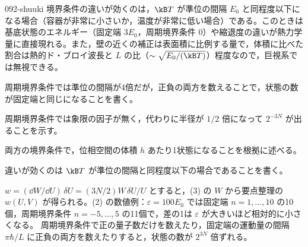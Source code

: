 \documentclass[uplatex,dvipdfmx,a4paper,11pt]{jsarticle}
\begin{document}
\begin{kaisetsu}{092-shuuki}
境界条件の違いが効くのは，$\kB T$ が準位の間隔 $E_{0}$ と同程度以下になる場合（容器が非常に小さいか，温度が非常に低い場合）である。このときは基底状態のエネルギー（固定端 $3E_{0}$，周期境界条件 $0$）や縮退度の違いが熱力学量に直接現れる。また，壁の近くの補正は表面積に比例する量で，体積に比べた割合は熱的ド・ブロイ波長と $L$ の比（$\sim\sqrt{E_{0}/(\kB T)}$）程度なので，巨視系では無視できる。
\begin{ronten}
  \item {} 周期境界条件では準位の間隔が4倍だが，正負の両方を数えることで，状態の数が固定端と同じになることを書く。
  \item {} 周期境界条件では象限の因子が無く，代わりに半径が $1/2$ 倍になって $2^{-3N}$ が出ることを示す。
  \item {} 両方の境界条件で，位相空間の体積 $h$ あたり1状態になることを根拠に述べる。
  \item {} 違いが効くのは $\kB T$ が準位の間隔と同程度以下の場合であることを書く。
\end{ronten}
\kenzan $w=(\dd W/\dd U)\,\delta U=(3N/2)W\,\delta U/U$ とすると，(3) の $W$ から要点整理の $w(U,V)$ が得られる。(2) の数値例：$\varepsilon=100E_{0}$ では固定端 $n=1,\dots,10$ の10個，周期境界条件 $n=-5,\dots,5$ の11個で，差の1は $\varepsilon$ が大きいほど相対的に小さくなる。
\tsumazuki 周期境界条件で正の量子数だけを数えたり，固定端の運動量の間隔 $\pi\hbar/L$ に正負の両方を数えたりすると，状態の数が $2^{3N}$ 倍ずれる。
\end{kaisetsu}
\end{document}
